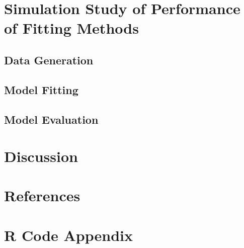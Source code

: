 \documentclass{article}\usepackage[]{graphicx}\usepackage[]{color}
\begin{document}
\section{Simulation Study of Performance of Fitting Methods}



\subsection{Data Generation}



\subsection{Model Fitting}



\subsection{Model Evaluation}



\section{Discussion}



\section{References}



\newpage 

\section{R Code Appendix}
\end{document}
